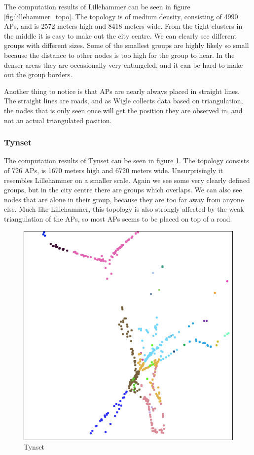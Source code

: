 \documentclass[a4paper,UKenglish]{report}
\begin{document}
The computation results of Lillehammer can be seen in figure \ref{fig:lillehammer_topo}.
The topology is of medium density, consisting of 4990 APs, and is 2572 meters high 
and 8418 meters wide. From the tight clusters in the middle it is easy to make out the city centre.
We can clearly see different groups with different sizes. Some of the smallest groups
are highly likely so small because the distance to other nodes is too high for
the group to hear. In the denser areas they are occasionally very
entangeled, and it can be hard to make out the group borders.

Another thing to notice is that APs are nearly always placed in straight lines.
The straight lines are roads, and as Wigle collects data based on triangulation, the nodes
that is only seen once will get the position they are observed in, and not an actual
triangulated position. 
\subsubsection{Tynset}
	The computation results of Tynset can be seen in figure \ref{fig:tynset_topo}. 
	The topology consists of 726 APs, is 1670 meters high and  6720 meters wide. 
	Unsurprisingly it resembles Lillehammer on a smaller scale.
	Again we see
	some very clearly defined groups, but in the city centre there are groups
	which overlaps. We can also see nodes that are alone in their group,
	because they are too far away from anyone else.
	Much like Lillehammer, this topology is also strongly affected by the weak
	triangulation of the APs, so most APs seems to be placed on top of a road. 

\begin{figure}
	\center
	\includegraphics[scale=0.46]{Images/cities/tynset_groups.jpg}
	\caption{Tynset}
	\label{fig:tynset_topo}
\end{figure}
\end{document}
